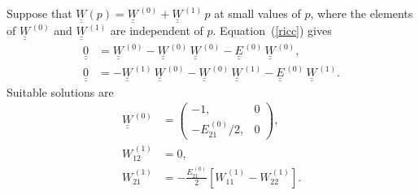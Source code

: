 \documentclass[12pt,prb,aps]{revtex4-1}
\begin{document}
Suppose that  $\underline{\underline{W}}(p)= \underline{\underline{W}}^{\,(0)}+ \underline{\underline{W}}^{\,(1)}\,p$ at small values of $p$,
where the elements of  $\underline{\underline{W}}^{\,(0)}$ and $\underline{\underline{W}}^{\,(1)}$ are independent of $p$. 
Equation~(\ref{ricc}) gives
\begin{align}
\underline{\underline{0}}&= \underline{\underline{W}}^{\,(0)}-\underline{\underline{W}}^{\,(0)}\,\underline{\underline{W}}^{\,(0)}- 
\underline{\underline{E}}^{\,(0)}\,\underline{\underline{W}}^{\,(0)},\\[0.5ex]
\underline{\underline{0}}&= -\underline{\underline{W}}^{\,(1)}\,\underline{\underline{W}}^{\,(0)}-\underline{\underline{W}}^{\,(0)}\,\underline{\underline{W}}^{\,(1)}- 
\underline{\underline{E}}^{\,(0)}\,\underline{\underline{W}}^{\,(1)}.
\end{align}
Suitable solutions are
\begin{align}\label{w0def}
\underline{\underline{W}}^{\,(0)} &=  \left(\begin{array}{cc} -1,&0\\-E_{21}^{\,(0)}/2,&0\end{array}\right),\\[0.5ex]
W_{12}^{\,(1)} &= 0,\\[0.5ex]
W_{21}^{\,(1)}& = -\frac{E_{21}^{\,(0)}}{2}\left[W_{11}^{\,(1)}- W_{22}^{\,(1)}\right].\label{w21def}
\end{align}
\end{document}
